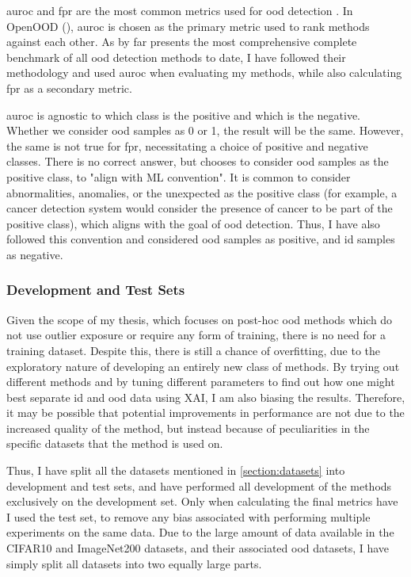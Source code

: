 \documentclass[UKenglish]{uiomasterthesis} %
\theoremstyle{definition}
\begin{document}
\ac{auroc} and \ac{fpr} are the most common metrics used for \ac{ood} detection \cite{oodbaseline, odin, oodoverview, openood, vim}. In OpenOOD (\cite{openood}), \ac{auroc} is chosen as the primary metric used to rank methods against each other. As \cite{openood} by far presents the most comprehensive complete benchmark of all \ac{ood} detection methods to date, I have followed their methodology and used \ac{auroc} when evaluating my methods, while also calculating \ac{fpr} as a secondary metric.

\ac{auroc} is agnostic to which class is the positive and which is the negative. Whether we consider \ac{ood} samples as 0 or 1, the result will be the same. However, the same is not true for \ac{fpr}, necessitating a choice of positive and negative classes. There is no correct answer, but \cite{openood} chooses to consider \ac{ood} samples as the positive class, to "align with ML convention". It is common to consider abnormalities, anomalies, or the unexpected as the positive class (for example, a cancer detection system would consider the presence of cancer to be part of the positive class), which aligns with the goal of \ac{ood} detection. Thus, I have also followed this convention and considered \ac{ood} samples as positive, and \ac{id} samples as negative.

\subsubsection{Development and Test Sets}

Given the scope of my thesis, which focuses on post-hoc \ac{ood} methods which do not use outlier exposure or require any form of training, there is no need for a training dataset. Despite this, there is still a chance of overfitting, due to the exploratory nature of developing an entirely new class of methods. By trying out different methods and by tuning different parameters to find out how one might best separate \ac{id} and \ac{ood} data using XAI, I am also biasing the results. Therefore, it may be possible that potential improvements in performance are not due to the increased quality of the method, but instead because of peculiarities in the specific datasets that the method is used on.

Thus, I have split all the datasets mentioned in \ref{section:datasets} into development and test sets, and have performed all development of the methods exclusively on the development set. Only when calculating the final metrics have I used the test set, to remove any bias associated with performing multiple experiments on the same data. Due to the large amount of data available in the CIFAR10 and ImageNet200 datasets, and their associated \ac{ood} datasets, I have simply split all datasets into two equally large parts.
\end{document}

